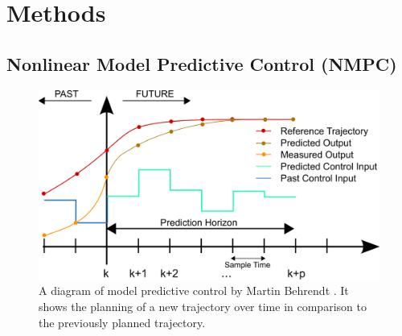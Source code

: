 \documentclass[11pt, titlepage]{article}
\begin{document}
    




\section{Methods}

\subsection{Nonlinear Model Predictive Control (NMPC)}

\begin{figure}[hbt!]
\centering
\includegraphics[width=0.5\linewidth]{MPC_scheme_basic.png}
\caption{\label{fig:mpc}A diagram of model predictive control by Martin Behrendt \cite{mpc_diagram}. It shows the planning of a new trajectory over time in comparison to the previously planned trajectory. }
\end{figure}
\end{document}
